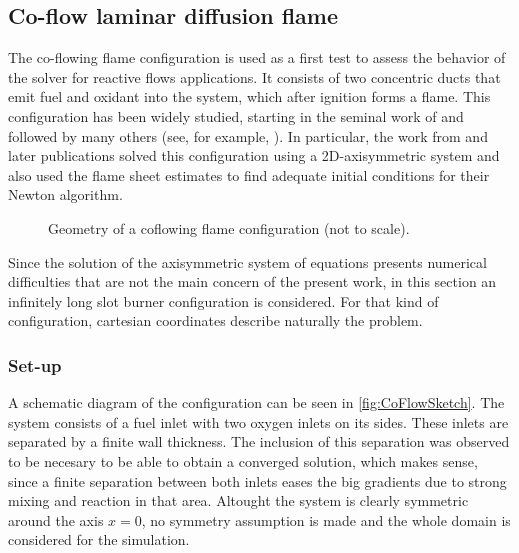 
\subsection{Co-flow laminar diffusion flame}\label{ssec:coflowFlame}
The co-flowing flame configuration is used as a first test to assess the behavior of the solver for reactive flows applications. It consists of two concentric ducts that emit fuel and oxidant into the system, which after ignition forms a flame. This configuration has been widely studied, starting in the seminal work of \textcite{burkeDiffusionFlames1928} and followed by many others (see, for example, \textcite{smookeNumericalModelingAxisymmetric1992, smookeNumericalSolutionTwoDimensional1986,braackAdaptiveFiniteElement1997}). In particular, the work from \textcite{smookeNumericalModelingAxisymmetric1992} and later publications solved this configuration using a 2D-axisymmetric system and also used the flame sheet estimates to find adequate initial conditions for their Newton algorithm. 
\begin{figure}[t]
	\centering
	\def\svgwidth{0.38\textwidth}
	\qquad\quad
	\def\svgwidth{0.35\textwidth}
	\caption{Geometry of a coflowing flame configuration (not to scale).} \label{fig:CoFlowGeometry}
\end{figure}

Since the solution of the axisymmetric system of equations presents numerical difficulties that are not the main concern of the present work, in this section an infinitely long slot burner configuration is considered. For that kind of configuration, cartesian coordinates describe naturally the problem. 
\subsubsection{Set-up}
A schematic diagram of the configuration can be seen in \cref{fig:CoFlowSketch}. The system consists of a fuel inlet with two oxygen inlets on its sides. These inlets are separated by a finite wall thickness. The inclusion of this separation was observed to be necesary to be able to obtain a converged solution, which makes sense, since a finite separation between both inlets eases the big gradients due to strong mixing and reaction in that area. Altought the system is clearly symmetric around the axis $x = 0$, no symmetry assumption is made and the whole domain is considered for the simulation.

